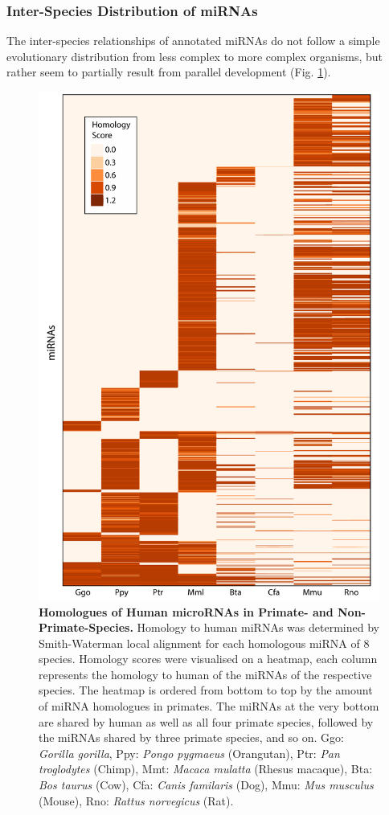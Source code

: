 \subsubsection{Inter-Species Distribution of miRNAs}
The inter-species relationships of annotated miRNAs do not follow a simple evolutionary distribution from less complex to more complex organisms, but rather seem to partially result from parallel development (Fig. \ref{fig:species-homo}). 

\begin{figure}
\includegraphics[width=\textwidth]{figures/species-homo}
\caption[microRNA Species Homology.]{\textbf{Homologues of Human microRNAs in Primate- and Non-Primate-Species.} Homology to human miRNAs was determined by Smith-Waterman local alignment for each homologous miRNA of 8 species. Homology scores were visualised on a heatmap, each column represents the homology to human of the miRNAs of the respective species. The heatmap is ordered from bottom to top by the amount of miRNA homologues in primates. The miRNAs at the very bottom are shared by human as well as all four primate species, followed by the miRNAs shared by three primate species, and so on. Ggo: \emph{Gorilla gorilla}, Ppy: \emph{Pongo pygmaeus} (Orangutan), Ptr: \emph{Pan troglodytes} (Chimp), Mmt: \emph{Macaca mulatta} (Rhesus macaque), Bta: \emph{Bos taurus} (Cow), Cfa: \emph{Canis familaris} (Dog), Mmu: \emph{Mus musculus} (Mouse), Rno: \emph{Rattus norvegicus} (Rat).
\label{fig:species-homo}}
\end{figure}

